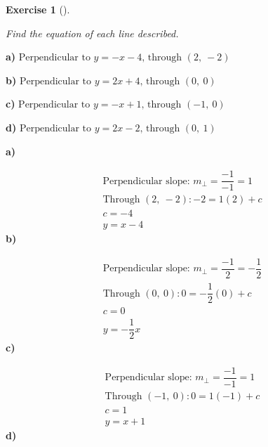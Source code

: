 \documentclass[
  letterpaper,
  DIV=11,
  numbers=noendperiod]{scrreprt}
\theoremstyle{definition}
\newtheorem{exercise}{Exercise}[chapter]
\theoremstyle{remark}
\begin{document}
\begin{exercise}[]\protect\hypertarget{exr-u7-16}{}\label{exr-u7-16}

\emph{Find the equation of each line described.}

\textbf{a)}
\(\displaystyle \text{Perpendicular to } y = -x - 4\text{, through } (2,\ -2)\)

\textbf{b)}
\(\displaystyle \text{Perpendicular to } y = 2x + 4\text{, through } (0,\ 0)\)

\textbf{c)}
\(\displaystyle \text{Perpendicular to } y = -x + 1\text{, through } (-1,\ 0)\)

\textbf{d)}
\(\displaystyle \text{Perpendicular to } y = 2x - 2\text{, through } (0,\ 1)\)

\begin{tcolorbox}[enhanced jigsaw, opacitybacktitle=0.6, coltitle=black, arc=.35mm, colframe=quarto-callout-tip-color-frame, colback=white, bottomrule=.15mm, left=2mm, colbacktitle=quarto-callout-tip-color!10!white, titlerule=0mm, opacityback=0, title=\textcolor{quarto-callout-tip-color}{\faLightbulb}\hspace{0.5em}{🔍 View Solutions}, leftrule=.75mm, breakable, rightrule=.15mm, bottomtitle=1mm, toptitle=1mm, toprule=.15mm]

\textbf{a)}

\[
\begin{aligned}
\text{Perpendicular slope: } m_\perp = \dfrac{-1}{-1} = 1 \\[4pt] \text{Through }(2,\ -2): -2 = 1(2) + c \\[4pt] c = -4 \\[4pt] y = x - 4
\end{aligned}
\] \textbf{b)}

\[
\begin{aligned}
\text{Perpendicular slope: } m_\perp = \dfrac{-1}{2} = -\dfrac{1}{2} \\[4pt] \text{Through }(0,\ 0): 0 = -\dfrac{1}{2}(0) + c \\[4pt] c = 0 \\[4pt] y = -\dfrac{1}{2}x
\end{aligned}
\] \textbf{c)}

\[
\begin{aligned}
\text{Perpendicular slope: } m_\perp = \dfrac{-1}{-1} = 1 \\[4pt] \text{Through }(-1,\ 0): 0 = 1(-1) + c \\[4pt] c = 1 \\[4pt] y = x + 1
\end{aligned}
\] \textbf{d)}


\end{tcolorbox}
\end{exercise}
\end{document}
